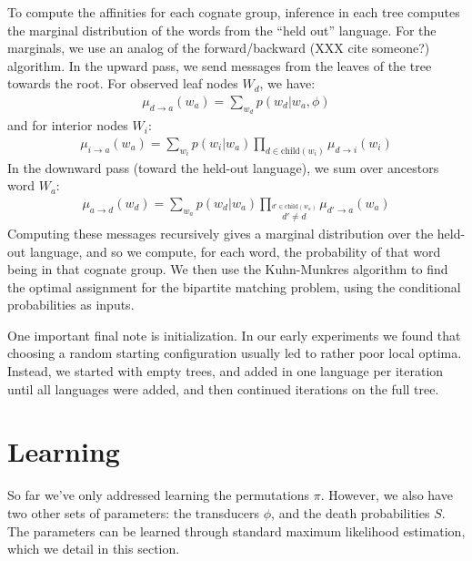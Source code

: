 \documentclass[11pt,a4paper]{article}
\begin{document}
To compute the affinities for each cognate group, inference in each
tree computes the marginal distribution of the words from the ``held
out'' language. For the marginals, we use an analog of the 
forward/backward (XXX cite someone?) algorithm. In the upward pass,
we send messages from the leaves of the tree towards the root. For observed
leaf nodes $W_d$, we have:
\begin{equation*}
  \begin{split}
    \mu_{d\to a}(w_a) = \sum_{w_d} p(w_d|w_a,\phi)
   \end{split}
 \end{equation*}
and for interior nodes $W_i$:
\begin{equation*}
  \begin{split}
    \mu_{i\to a}(w_a) = \sum_{w_i} p(w_i|w_a) \prod_{d \in \mathrm{child}(w_i)} \mu_{d \to i}(w_i) 
  \end{split}
\end{equation*}
In the downward pass (toward the held-out language), we sum over ancestors word $W_a$:
\begin{equation*}
  \begin{split}
    \mu_{a\to d}(w_d) = \sum_{w_a} p(w_d|w_a) \prod_{\stackrel{d' \in \mathrm{child}(w_a)}{d' \neq d}} \mu_{d' \to a}(w_a) 
  \end{split}
\end{equation*}
Computing these messages recursively gives a marginal distribution
over the held-out language, and so we compute, for each word, the
probability of that word being in that cognate group. We then use
the Kuhn-Munkres algorithm \cite{Kuhn1955} to find the optimal
assignment for the bipartite matching problem, using the conditional
probabilities as inputs.

One important final note is initialization. In our early experiments
we found that choosing a random starting configuration usually led
to rather poor local optima. Instead, we started with empty trees,
and added in one language per iteration until all languages were
added, and then continued iterations on the full tree.

\section{Learning} 

So far we've only addressed learning the permutations $\pi$. However,
we also have two other sets of parameters: the transducers $\phi$,
and the death probabilities $S$. The parameters can be learned
through standard maximum likelihood estimation, which we detail in
this section.
\end{document}
